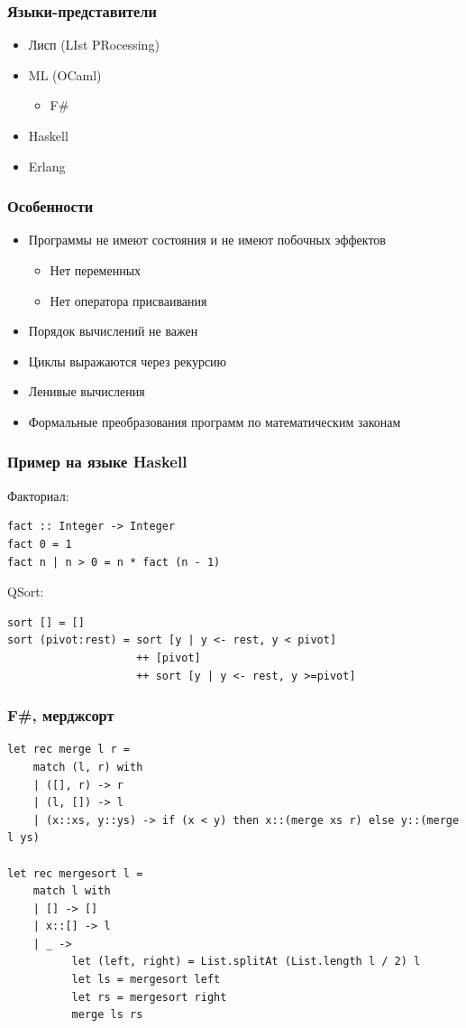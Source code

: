 \documentclass[xetex,mathserif,serif]{beamer}
\begin{document}
	\begin{frame}
		\frametitle{Языки-представители}
		\begin{itemize}
			\item Лисп (LIst PRocessing)
			\item ML (OCaml)
			\begin{itemize}
				\item F\#
			\end{itemize}
			\item Haskell
			\item Erlang
		\end{itemize}
	\end{frame}

	\begin{frame}
		\frametitle{Особенности}
		\begin{itemize}
			\item Программы не имеют состояния и не имеют побочных эффектов
			\begin{itemize}
				\item Нет переменных
				\item Нет оператора присваивания
			\end{itemize}
			\item Порядок вычислений не важен
			\item Циклы выражаются через рекурсию
			\item Ленивые вычисления
			\item Формальные преобразования программ по математическим законам
		\end{itemize}
	\end{frame}

	\begin{frame}[fragile]
		\frametitle{Пример на языке Haskell}
		Факториал:
		\begin{verbatim}
fact :: Integer -> Integer 
fact 0 = 1 
fact n | n > 0 = n * fact (n - 1) 
		\end{verbatim}

		QSort:
		\begin{verbatim}
sort [] = [] 
sort (pivot:rest) = sort [y | y <- rest, y < pivot] 
                    ++ [pivot]
                    ++ sort [y | y <- rest, y >=pivot] 

		\end{verbatim}
	\end{frame}

	\begin{frame}[fragile]
		\frametitle{F\#, мерджсорт}
		\begin{small}
			\begin{verbatim}
let rec merge l r =
    match (l, r) with
    | ([], r) -> r
    | (l, []) -> l
    | (x::xs, y::ys) -> if (x < y) then x::(merge xs r) else y::(merge l ys)
 
let rec mergesort l = 
    match l with
    | [] -> []
    | x::[] -> l
    | _ -> 
          let (left, right) = List.splitAt (List.length l / 2) l
          let ls = mergesort left
          let rs = mergesort right
          merge ls rs
			\end{verbatim}
		\end{small}
	\end{frame}
\end{document}
